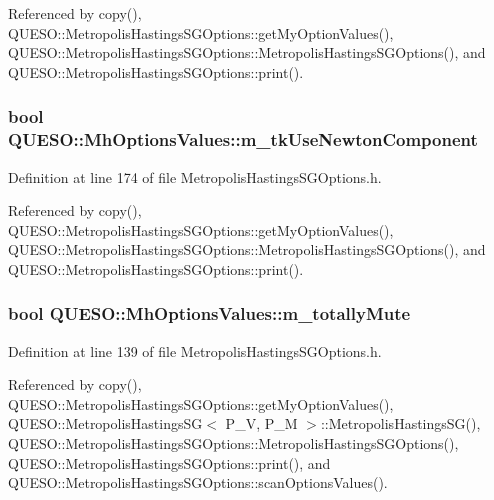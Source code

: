 Referenced by copy(), Q\-U\-E\-S\-O\-::\-Metropolis\-Hastings\-S\-G\-Options\-::get\-My\-Option\-Values(), Q\-U\-E\-S\-O\-::\-Metropolis\-Hastings\-S\-G\-Options\-::\-Metropolis\-Hastings\-S\-G\-Options(), and Q\-U\-E\-S\-O\-::\-Metropolis\-Hastings\-S\-G\-Options\-::print().

\hypertarget{class_q_u_e_s_o_1_1_mh_options_values_ae4fcf242f3d9e216c17d057faf6939c3}{
\subsubsection[{m\-\_\-tk\-Use\-Newton\-Component}]{\setlength{\rightskip}{0pt plus 5cm}bool Q\-U\-E\-S\-O\-::\-Mh\-Options\-Values\-::m\-\_\-tk\-Use\-Newton\-Component}}\label{class_q_u_e_s_o_1_1_mh_options_values_ae4fcf242f3d9e216c17d057faf6939c3}


Definition at line 174 of file Metropolis\-Hastings\-S\-G\-Options.\-h.



Referenced by copy(), Q\-U\-E\-S\-O\-::\-Metropolis\-Hastings\-S\-G\-Options\-::get\-My\-Option\-Values(), Q\-U\-E\-S\-O\-::\-Metropolis\-Hastings\-S\-G\-Options\-::\-Metropolis\-Hastings\-S\-G\-Options(), and Q\-U\-E\-S\-O\-::\-Metropolis\-Hastings\-S\-G\-Options\-::print().

\hypertarget{class_q_u_e_s_o_1_1_mh_options_values_af812309e81191e88dfdc87c5815141a3}{
\subsubsection[{m\-\_\-totally\-Mute}]{\setlength{\rightskip}{0pt plus 5cm}bool Q\-U\-E\-S\-O\-::\-Mh\-Options\-Values\-::m\-\_\-totally\-Mute}}\label{class_q_u_e_s_o_1_1_mh_options_values_af812309e81191e88dfdc87c5815141a3}


Definition at line 139 of file Metropolis\-Hastings\-S\-G\-Options.\-h.



Referenced by copy(), Q\-U\-E\-S\-O\-::\-Metropolis\-Hastings\-S\-G\-Options\-::get\-My\-Option\-Values(), Q\-U\-E\-S\-O\-::\-Metropolis\-Hastings\-S\-G$<$ P\-\_\-\-V, P\-\_\-\-M $>$\-::\-Metropolis\-Hastings\-S\-G(), Q\-U\-E\-S\-O\-::\-Metropolis\-Hastings\-S\-G\-Options\-::\-Metropolis\-Hastings\-S\-G\-Options(), Q\-U\-E\-S\-O\-::\-Metropolis\-Hastings\-S\-G\-Options\-::print(), and Q\-U\-E\-S\-O\-::\-Metropolis\-Hastings\-S\-G\-Options\-::scan\-Options\-Values().



